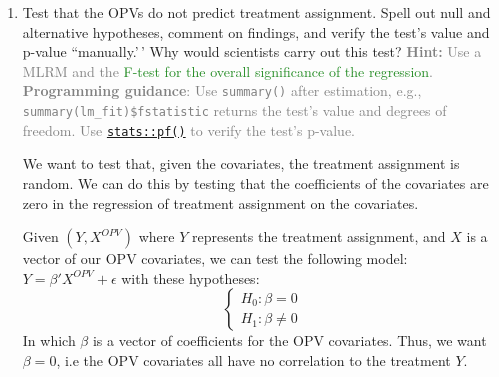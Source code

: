 \documentclass[
]{article}
\newenvironment{Shaded}{\begin{snugshade}}{\end{snugshade}}
\newcommand{\AttributeTok}[1]{\textcolor[rgb]{0.13,0.29,0.53}{#1}}
\newcommand{\CommentTok}[1]{\textcolor[rgb]{0.56,0.35,0.01}{\textit{#1}}}
\newcommand{\FunctionTok}[1]{\textcolor[rgb]{0.13,0.29,0.53}{\textbf{#1}}}
\newcommand{\NormalTok}[1]{#1}
\newcommand{\OtherTok}[1]{\textcolor[rgb]{0.56,0.35,0.01}{#1}}
\newcommand{\StringTok}[1]{\textcolor[rgb]{0.31,0.60,0.02}{#1}}
\begin{document}
\begin{enumerate}
\def\labelenumi{\arabic{enumi}.}
\setcounter{enumi}{2}
\item
  Test that the OPVs do not predict treatment assignment. Spell out null
  and alternative hypotheses, comment on findings, and verify the test's
  value and p-value ``manually.'\,' Why would scientists carry out this
  test?
  \textcolor{gray}{\textbf{Hint:} Use a MLRM and the \textcolor{ForestGreen}{F-test for the overall significance of the regression}. \textbf{Programming guidance}: Use \texttt{summary()} after estimation, e.g., \texttt{summary(lm\_fit)\$fstatistic} returns the test's value and degrees of freedom. Use \href{https://stat.ethz.ch/R-manual/R-devel/library/stats/html/Fdist.html}{\texttt{stats::pf()}} to verify the test's p-value.}

  We want to test that, given the covariates, the treatment assignment
  is random. We can do this by testing that the coefficients of the
  covariates are zero in the regression of treatment assignment on the
  covariates. \newline

  Given \((Y, X^{OPV})\) where \(Y\) represents the treatment
  assignment, and \(X\) is a vector of our OPV covariates, we can test
  the following model: \(Y = \beta'X^{OPV} + \epsilon\) with these
  hypotheses: \newline  \[ 
   \begin{cases}
   H_0: \beta = 0 \\
   H_1: \beta \neq 0 
   \end{cases}
   \] In which \(\beta\) is a vector of coefficients for the OPV
  covariates. Thus, we want \(\beta = 0\), i.e the OPV covariates all
  have no correlation to the treatment \(Y\).
\end{enumerate}

\begin{Shaded}
\end{Shaded}
\end{document}
